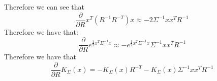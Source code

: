 \documentclass[10pt]{article}
\begin{document}
Therefore we can see that 
\begin{equation}
    \frac{\partial}{\partial R} x^T(R^{-1}R^{-T})x \approx -2\Sigma^{-1}xx^T R^{-1}
\end{equation}
Therefore we have that:
\begin{equation}
    \frac{\partial}{\partial R} e^{\frac{1}{2}x^T\Sigma^{-1}x} \approx -e^{\frac{1}{2}x^T\Sigma^{-1}x} \Sigma^{-1}xx^T R^{-1}
\end{equation}
Therefore we have that
\begin{equation*}
    \frac{\partial}{\partial R} K_{\Sigma}(x) = -K_{\Sigma}(x)R^{-T} - K_{\Sigma}(x)\Sigma^{-1}xx^T R^{-1}
\end{equation*} 
\end{document}
